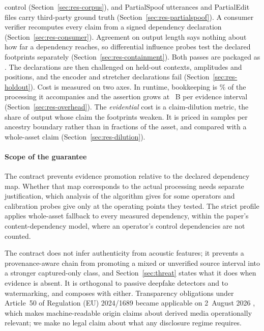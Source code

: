\documentclass[preprint,3p,11pt,authoryear]{elsarticle}
\begin{document}
\begin{enumerate}
  control (Section~\ref{sec:res-corpus}), and \Qclips{} PartialSpoof utterances
  and \Rclips{} PartialEdit files carry third-party ground truth
  (Section~\ref{sec:res-partialspoof}). A
  consumer verifier recomputes every claim from a signed dependency declaration
  (Section~\ref{sec:res-consumer}). Agreement on output length says
  nothing about how far a dependency reaches, so differential influence probes
  test the declared footprints separately
  (Section~\ref{sec:res-containment}). Both passes are packaged as
  . The declarations are then challenged on held-out contexts, amplitudes and positions,
  and the encoder and stretcher declarations fail (Section~\ref{sec:res-holdout}). Cost is measured on two axes. In runtime,
  bookkeeping is \GffmpegPct{}\% of the processing it accompanies and the
  assertion grows at \GperInterval{}~B per evidence interval
  (Section~\ref{sec:res-overhead}). The \emph{evidential} cost is a claim-dilution
  metric, the share of output whose claim the footprints weaken. It is priced in samples per ancestry boundary rather than in fractions of
  the asset, and compared with a whole-asset claim (Section~\ref{sec:res-dilution}).
\end{enumerate}

\paragraph{Scope of the guarantee} The contract prevents evidence promotion
relative to the declared dependency map. Whether that map corresponds to the
actual processing needs separate justification, which analysis of the algorithm
gives for some operators and calibration probes give only at the operating points
they tested. The strict profile applies whole-asset fallback to every measured
dependency, within the paper's content-dependency model, where an operator's
control dependencies are not counted.

The contract does not infer authenticity from acoustic features; it prevents a
provenance-aware chain from promoting a mixed or unverified source interval
into a stronger captured-only class, and Section~\ref{sec:threat} states what
it does when evidence is absent. It is orthogonal to passive deepfake detectors
and to watermarking, and composes with either. Transparency obligations under
Article~50 of Regulation (EU) 2024/1689 became applicable on 2~August 2026
\citep{euaiact}, which makes machine-readable origin claims about derived media
operationally relevant; we make no legal claim about what any disclosure regime
requires.
\end{document}
